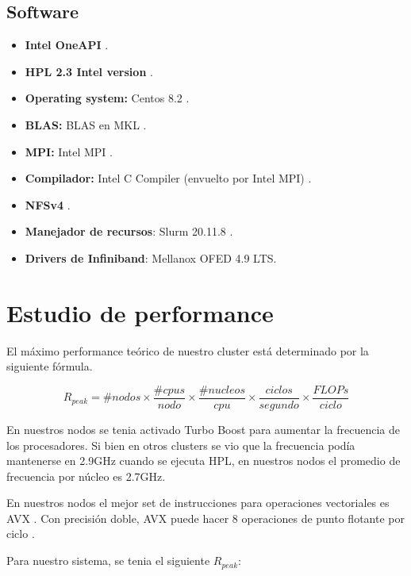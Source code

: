 \documentclass[conference,compsoc]{IEEEtran}
\begin{document}
\subsection{Software}\label{OurOwnCluster:SoftwareEnvironment}

\begin{itemize}
    \item \textbf{Intel OneAPI} \cite{intel-oneapi}.
	\item \textbf{HPL 2.3 Intel version} \cite{intel-hplversion}.	
	\item \textbf{Operating system:} Centos 8.2 \cite{centos}.
	\item \textbf{BLAS:} BLAS en MKL \cite{intel-mkl-blas}.
	\item \textbf{MPI:} Intel MPI \cite{intel-mpi}.
    \item \textbf{Compilador:} Intel C Compiler (envuelto por Intel MPI) \cite{intel-compiler}.
	\item \textbf{NFSv4} \cite{nfs-tutorial}.
	\item \textbf{Manejador de recursos}: Slurm 20.11.8 \cite{slurm20-11-8}.
	\item \textbf{Drivers de Infiniband}: Mellanox OFED 4.9 LTS.
\end{itemize}

\section{Estudio de performance}

El máximo performance teórico de nuestro cluster está determinado por la siguiente fórmula. 

\begin{equation} \label{eq:1}
	R_{peak} = \#nodos \times \frac{\#cpus}{nodo} \times \frac{\#nucleos}{cpu} \times \frac{ciclos}{segundo} \times \frac{FLOPs}{ciclo} 
\end{equation}

En nuestros nodos se tenia activado Turbo Boost para aumentar la frecuencia de los procesadores. Si bien en otros clusters se vio que la frecuencia podía mantenerse en 2.9GHz cuando se ejecuta HPL, en nuestros nodos el promedio de frecuencia por núcleo es 2.7GHz.

En nuestros nodos el mejor set de instrucciones para operaciones vectoriales es AVX \cite{intel-avx}. Con precisión doble, AVX puede hacer 8 operaciones de punto flotante por ciclo \cite{wikichip-flops}.

Para nuestro sistema, se tenia el siguiente $R_{peak}$:
\end{document}
